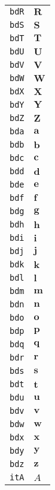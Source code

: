 \begin{longtable}{ll}
\texttt{bdR}&${}{\textbf{R}}{}$\\
\texttt{bdS}&${}{\textbf{S}}{}$\\
\texttt{bdT}&${}{\textbf{T}}{}$\\
\texttt{bdU}&${}{\textbf{U}}{}$\\
\texttt{bdV}&${}{\textbf{V}}{}$\\
\texttt{bdW}&${}{\textbf{W}}{}$\\
\texttt{bdX}&${}{\textbf{X}}{}$\\
\texttt{bdY}&${}{\textbf{Y}}{}$\\
\texttt{bdZ}&${}{\textbf{Z}}{}$\\
\texttt{bda}&${}{\textbf{a}}{}$\\
\texttt{bdb}&${}{\textbf{b}}{}$\\
\texttt{bdc}&${}{\textbf{c}}{}$\\
\texttt{bdd}&${}{\textbf{d}}{}$\\
\texttt{bde}&${}{\textbf{e}}{}$\\
\texttt{bdf}&${}{\textbf{f}}{}$\\
\texttt{bdg}&${}{\textbf{g}}{}$\\
\texttt{bdh}&${}{\textbf{h}}{}$\\
\texttt{bdi}&${}{\textbf{i}}{}$\\
\texttt{bdj}&${}{\textbf{j}}{}$\\
\texttt{bdk}&${}{\textbf{k}}{}$\\
\texttt{bdl}&${}{\textbf{l}}{}$\\
\texttt{bdm}&${}{\textbf{m}}{}$\\
\texttt{bdn}&${}{\textbf{n}}{}$\\
\texttt{bdo}&${}{\textbf{o}}{}$\\
\texttt{bdp}&${}{\textbf{p}}{}$\\
\texttt{bdq}&${}{\textbf{q}}{}$\\
\texttt{bdr}&${}{\textbf{r}}{}$\\
\texttt{bds}&${}{\textbf{s}}{}$\\
\texttt{bdt}&${}{\textbf{t}}{}$\\
\texttt{bdu}&${}{\textbf{u}}{}$\\
\texttt{bdv}&${}{\textbf{v}}{}$\\
\texttt{bdw}&${}{\textbf{w}}{}$\\
\texttt{bdx}&${}{\textbf{x}}{}$\\
\texttt{bdy}&${}{\textbf{y}}{}$\\
\texttt{bdz}&${}{\textbf{z}}{}$\\
\texttt{itA}&${}{\textit{A}}{}$\\

\end{longtable}
